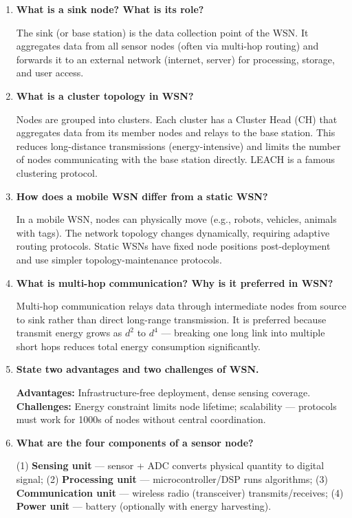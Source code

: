\documentclass[12pt,a4paper]{article}
\newcommand{\Q}[1]{\textbf{#1}\par\noindent\ignorespaces}
\begin{document}
\begin{tcolorbox}[exambox, title={\textbf{Frequently Asked / Viva Questions}}]
\begin{enumerate}[topsep=0pt, label=\textbf{Q\arabic*.}, itemsep=5pt]
  \item \Q{What is a sink node? What is its role?}
  The sink (or base station) is the data collection point of the WSN. It aggregates data from all sensor nodes (often via multi-hop routing) and forwards it to an external network (internet, server) for processing, storage, and user access.

  \item \Q{What is a cluster topology in WSN?}
  Nodes are grouped into clusters. Each cluster has a Cluster Head (CH) that aggregates data from its member nodes and relays to the base station. This reduces long-distance transmissions (energy-intensive) and limits the number of nodes communicating with the base station directly. LEACH is a famous clustering protocol.

  \item \Q{How does a mobile WSN differ from a static WSN?}
  In a mobile WSN, nodes can physically move (e.g., robots, vehicles, animals with tags). The network topology changes dynamically, requiring adaptive routing protocols. Static WSNs have fixed node positions post-deployment and use simpler topology-maintenance protocols.

  \item \Q{What is multi-hop communication? Why is it preferred in WSN?}
  Multi-hop communication relays data through intermediate nodes from source to sink rather than direct long-range transmission. It is preferred because transmit energy grows as $d^2$ to $d^4$ --- breaking one long link into multiple short hops reduces total energy consumption significantly.

  \item \Q{State two advantages and two challenges of WSN.}
  \textbf{Advantages:} Infrastructure-free deployment, dense sensing coverage. \textbf{Challenges:} Energy constraint limits node lifetime; scalability --- protocols must work for 1000s of nodes without central coordination.

  \item \Q{What are the four components of a sensor node?}
  (1) \textbf{Sensing unit} --- sensor + ADC converts physical quantity to digital signal; (2) \textbf{Processing unit} --- microcontroller/DSP runs algorithms; (3) \textbf{Communication unit} --- wireless radio (transceiver) transmits/receives; (4) \textbf{Power unit} --- battery (optionally with energy harvesting).
\end{enumerate}
\end{tcolorbox}
\end{document}
